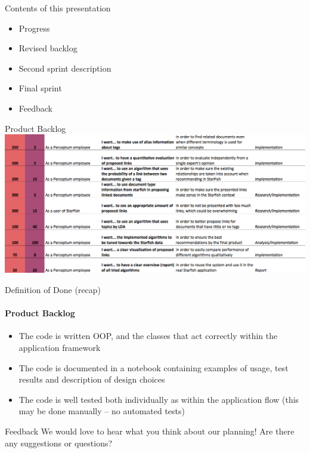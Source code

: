 
\begin{frame}[t,plain]
\titlepage
\end{frame}

\begin{frame}[t]{Contents of this presentation}
\begin{itemize}
	\item Progress
	\item Revised backlog
	\item Second sprint description 
	\item Final sprint 
	\item Feedback
\end{itemize}
\end{frame}



\begin{frame}[t]{Product Backlog}
  \includegraphics[width=\linewidth]{backlog2}
\end{frame}

\begin{frame}[t]{Definition of Done (recap)}
\framesubtitle{Product Backlog}

\begin{itemize}
	\item  The code is written OOP, and the classes that act correctly within the application framework
	\item The code is documented in a notebook containing examples of usage, test results and description of design choices 
	\item The code is well tested both individually as within the application flow (this may be done manually – no automated tests)
\end{itemize}
\end{frame}



\begin{frame}[t]{Feedback}
We would love to hear what you think about our planning! Are there any suggestions or questions?
\end{frame}
